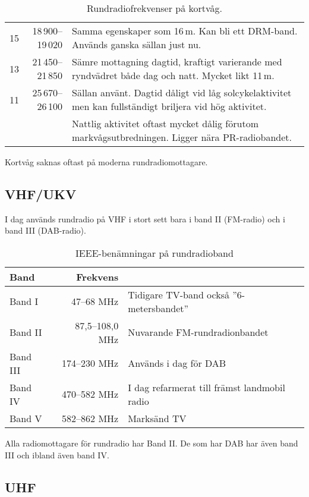 \begin{table}[H]
{\begin{tabular}{rrl}
	      15 & 18\,900--19\,020 & Samma egenskaper som 16\,m. Kan bli ett DRM-band. Används ganska sällan just nu.                        \\
	      13 & 21\,450--21\,850 & Sämre mottagning dagtid, kraftigt varierande med ryndvädret både dag och natt. Mycket likt 11\,m.       \\
	      11 & 25\,670--26\,100 & Sällan använt. Dagtid dåligt vid låg solcykelaktivitet men kan fullständigt briljera vid hög aktivitet. \\
	         &                  & Nattlig aktivitet oftast mycket dålig förutom markvågsutbredningen. Ligger nära PR-radiobandet.
\end{tabular}}
\caption{Rundradiofrekvenser på kortvåg.}
\end{table}

Kortvåg saknas oftast på moderna rundradiomottagare.

\subsection{VHF/UKV}

I dag används rundradio på VHF i stort sett bara i band II (FM-radio) och i band III (DAB-radio).

\begin{table}[H]
	\centering
	\begin{tabular}{lrl}
		\textbf{Band} & \textbf{Frekvens} &                                              \\ \hline
		Band I        &        47--68 MHz & Tidigare TV-band också ''6-metersbandet''    \\
		Band II       &   87,5--108,0 MHz & Nuvarande FM-rundradionbandet                \\
		Band III      &      174--230 MHz & Används i dag för DAB                        \\
		Band IV       &      470--582 MHz & I dag refarmerat till främst landmobil radio \\
		Band V        &      582--862 MHz & Marksänd TV
	\end{tabular}
	\caption{IEEE-benämningar på rundradioband}
\end{table}

Alla radiomottagare för rundradio har Band II. De som har DAB har även band
III och ibland även band IV.


\subsection{UHF}

